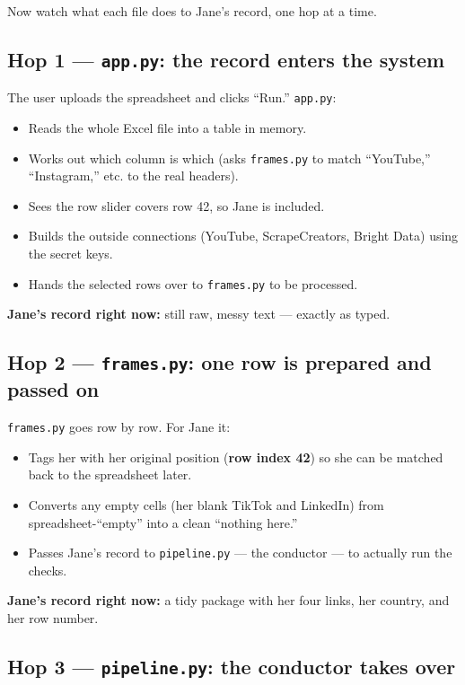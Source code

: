 \documentclass[11pt]{article}
\newcommand{\file}[1]{\texttt{\color{inkdark}#1}}
\begin{document}
Now watch what each file does to Jane's record, one hop at a time.

\subsection{Hop 1 — \file{app.py}: the record enters the system}

The user uploads the spreadsheet and clicks ``Run.'' \file{app.py}:
\begin{itemize}
  \item Reads the whole Excel file into a table in memory.
  \item Works out which column is which (asks \file{frames.py} to match
  ``YouTube,'' ``Instagram,'' etc. to the real headers).
  \item Sees the row slider covers row 42, so Jane is included.
  \item Builds the outside connections (YouTube, ScrapeCreators, Bright Data)
  using the secret keys.
  \item Hands the selected rows over to \file{frames.py} to be processed.
\end{itemize}
\textbf{Jane's record right now:} still raw, messy text — exactly as typed.

\subsection{Hop 2 — \file{frames.py}: one row is prepared and passed on}

\file{frames.py} goes row by row. For Jane it:
\begin{itemize}
  \item Tags her with her original position (\textbf{row index 42}) so she can
  be matched back to the spreadsheet later.
  \item Converts any empty cells (her blank TikTok and LinkedIn) from
  spreadsheet-``empty'' into a clean ``nothing here.''
  \item Passes Jane's record to \file{pipeline.py} — the conductor — to actually
  run the checks.
\end{itemize}
\textbf{Jane's record right now:} a tidy package with her four links, her
country, and her row number.

\subsection{Hop 3 — \file{pipeline.py}: the conductor takes over}
\end{document}
